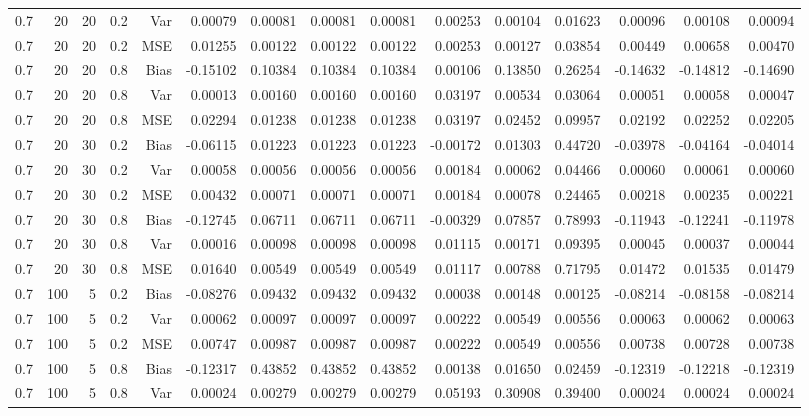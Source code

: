 \begin{table}[!htbp]
\begin{tabular}{lrrrrrrrrrrrrrr}
0.7 &  20 & 20 & 0.2 & Var & 0.00079 & 0.00081 & 0.00081 & 0.00081 & 0.00253 & 0.00104 & 0.01623 & 0.00096 & 0.00108 & 0.00094 \\
0.7 &  20 & 20 & 0.2 & MSE & 0.01255 & 0.00122 & 0.00122 & 0.00122 & 0.00253 & 0.00127 & 0.03854 & 0.00449 & 0.00658 & 0.00470 \\
0.7 &  20 & 20 & 0.8 & Bias & -0.15102 & 0.10384 & 0.10384 & 0.10384 & 0.00106 & 0.13850 & 0.26254 & -0.14632 & -0.14812 & -0.14690 \\
0.7 &  20 & 20 & 0.8 & Var & 0.00013 & 0.00160 & 0.00160 & 0.00160 & 0.03197 & 0.00534 & 0.03064 & 0.00051 & 0.00058 & 0.00047 \\
0.7 &  20 & 20 & 0.8 & MSE & 0.02294 & 0.01238 & 0.01238 & 0.01238 & 0.03197 & 0.02452 & 0.09957 & 0.02192 & 0.02252 & 0.02205 \\
0.7 &  20 & 30 & 0.2 & Bias & -0.06115 & 0.01223 & 0.01223 & 0.01223 & -0.00172 & 0.01303 & 0.44720 & -0.03978 & -0.04164 & -0.04014 \\
0.7 &  20 & 30 & 0.2 & Var & 0.00058 & 0.00056 & 0.00056 & 0.00056 & 0.00184 & 0.00062 & 0.04466 & 0.00060 & 0.00061 & 0.00060 \\
0.7 &  20 & 30 & 0.2 & MSE & 0.00432 & 0.00071 & 0.00071 & 0.00071 & 0.00184 & 0.00078 & 0.24465 & 0.00218 & 0.00235 & 0.00221 \\
0.7 &  20 & 30 & 0.8 & Bias & -0.12745 & 0.06711 & 0.06711 & 0.06711 & -0.00329 & 0.07857 & 0.78993 & -0.11943 & -0.12241 & -0.11978 \\
0.7 &  20 & 30 & 0.8 & Var & 0.00016 & 0.00098 & 0.00098 & 0.00098 & 0.01115 & 0.00171 & 0.09395 & 0.00045 & 0.00037 & 0.00044 \\
0.7 &  20 & 30 & 0.8 & MSE & 0.01640 & 0.00549 & 0.00549 & 0.00549 & 0.01117 & 0.00788 & 0.71795 & 0.01472 & 0.01535 & 0.01479 \\
0.7 & 100 &  5 & 0.2 & Bias & -0.08276 & 0.09432 & 0.09432 & 0.09432 & 0.00038 & 0.00148 & 0.00125 & -0.08214 & -0.08158 & -0.08214 \\
0.7 & 100 &  5 & 0.2 & Var & 0.00062 & 0.00097 & 0.00097 & 0.00097 & 0.00222 & 0.00549 & 0.00556 & 0.00063 & 0.00062 & 0.00063 \\
0.7 & 100 &  5 & 0.2 & MSE & 0.00747 & 0.00987 & 0.00987 & 0.00987 & 0.00222 & 0.00549 & 0.00556 & 0.00738 & 0.00728 & 0.00738 \\
0.7 & 100 &  5 & 0.8 & Bias & -0.12317 & 0.43852 & 0.43852 & 0.43852 & 0.00138 & 0.01650 & 0.02459 & -0.12319 & -0.12218 & -0.12319 \\
0.7 & 100 &  5 & 0.8 & Var & 0.00024 & 0.00279 & 0.00279 & 0.00279 & 0.05193 & 0.30908 & 0.39400 & 0.00024 & 0.00024 & 0.00024 \\

\end{tabular}
\end{table}
